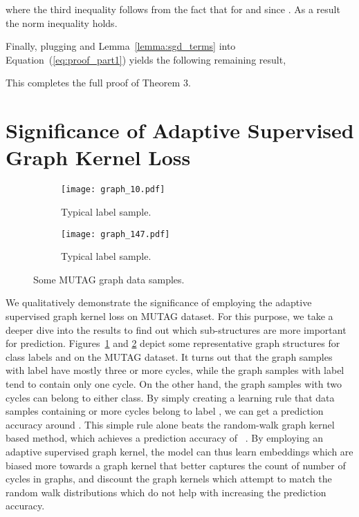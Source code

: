 \documentclass{article}
\begin{document}
where the third inequality follows from the fact that  for  and since . As a result the norm inequality  holds. 


Finally, plugging  and Lemma~\ref{lemma:sgd_terms} into Equation~(\ref{eq:proof_part1}) yields the following remaining result,



This completes the full proof of Theorem 3.

\section{Significance of Adaptive Supervised Graph Kernel Loss }


\begin{figure}[h!]
	
	\begin{subfigure}[t]{0.45\textwidth}
		\centering
		\texttt{[image: graph\_10.pdf]}
		\vspace{-2em}
		\caption{Typical label  sample.}
		\label{fig:l1_sample}
	\end{subfigure}
\begin{subfigure}[t]{0.45\textwidth}
		\centering
		\texttt{[image: graph\_147.pdf]}
		\vspace{-2em}
		\caption[short]{Typical label   sample. }
		
		\label{fig:l2_sample}
	\end{subfigure} 
	
	\caption{Some MUTAG graph data samples.}\label{fig:projection-results}
	
\end{figure}

We qualitatively demonstrate the    significance of employing the adaptive supervised graph kernel loss on MUTAG dataset. For this purpose, we take a deeper dive into the results to find out which sub-structures are more important for prediction.  Figures~\ref{fig:l1_sample} and \ref{fig:l2_sample} depict some representative  graph structures for class labels  and    on the MUTAG dataset. It turns out that the graph samples with label  have mostly three or more cycles, while the graph samples with  label  tend to contain only one cycle. On the other hand, the graph samples with two cycles can belong to either class. By  simply  creating a learning rule that data samples containing  or more cycles belong to label , we can get a prediction  accuracy around . This simple rule alone beats the random-walk graph kernel based method, which achieves a prediction accuracy of ~\cite{shervashidze2011weisfeiler}. By employing an adaptive supervised graph kernel, the model can thus learn  embeddings which are biased more towards a graph kernel that better captures the count of number of cycles in graphs, and discount the graph kernels which attempt to match the random walk distributions which do not help with increasing the prediction accuracy. 
\end{document}
